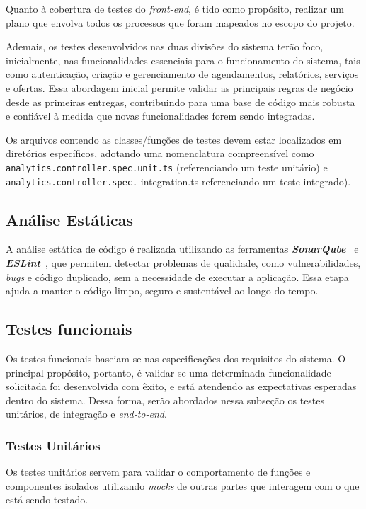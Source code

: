 Quanto à cobertura de testes do \textit{front-end}, é tido como propósito, realizar um plano que envolva todos os processos que foram mapeados no escopo do projeto.

Ademais, os testes desenvolvidos nas duas divisões do sistema terão foco, inicialmente, nas funcionalidades essenciais para o funcionamento do sistema, tais como autenticação, criação e gerenciamento de agendamentos, relatórios, serviços e ofertas. Essa abordagem inicial permite validar as principais regras de negócio desde as primeiras entregas, contribuindo para uma base de código mais robusta e confiável à medida que novas funcionalidades forem sendo integradas.

Os arquivos contendo as classes/funções de testes devem estar localizados em diretórios específicos, adotando uma nomenclatura compreensível como 
\texttt{analytics.\allowbreak controller.\allowbreak spec.\allowbreak unit.ts} (referenciando um teste unitário) e \texttt{analytics.controller.spec.}%
\linebreak%
{\ttfamily integration.ts} referenciando um teste integrado).

\subsection{Análise Estáticas}
A análise estática de código é realizada utilizando as ferramentas \textbf{\textit{SonarQube}}~\cite{sonarqube-2025} e \textbf{\textit{ESLint}}~\cite{eslint-2025}, 
que permitem detectar problemas de qualidade, como vulnerabilidades, \textit{bugs} e código duplicado, sem a necessidade de executar a aplicação. Essa etapa ajuda a manter o código limpo, seguro e sustentável ao longo do tempo.

\subsection{Testes funcionais}
Os testes funcionais baseiam-se nas especificações dos requisitos do sistema. O principal propósito, portanto, é validar se uma determinada funcionalidade solicitada foi desenvolvida com êxito, e está atendendo as expectativas esperadas dentro do sistema. Dessa forma, serão abordados nessa subseção os testes unitários, de integração e \textit{end-to-end}. 

\subsubsection{Testes Unitários}
Os testes unitários servem para validar o comportamento de funções e componentes isolados utilizando \textit{mocks} de outras partes que interagem com o que está sendo testado.

